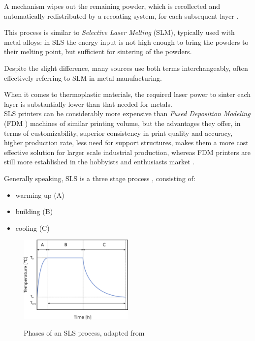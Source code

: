 \documentclass[a4paper]{article}
\begin{document}
    A mechanism wipes out the remaining powder, which is recollected and automatically redistributed by a recoating 
    system, for each subsequent layer \autocite*{Padovano_SLS_Review}. 

    This process is similar to \textit{Selective Laser Melting} (SLM), typically used with metal alloys: in SLS the energy input is not high enough 
    to bring the powders to their melting point, but sufficient for sintering of the powders. 

    Despite the slight difference, many sources use both terms interchangeably, often effectively referring to SLM in metal manufacturing. 
    
    When it comes to thermoplastic materials, the required laser power to sinter each layer is substantially lower than that needed for metals. \\ 

    SLS printers can be considerably more expensive than \textit{Fused Deposition Modeling} (FDM \footnotemark) machines of similar printing volume, but the advantages they offer, 
    in terms of customizability, superior consistency in print quality and accuracy, higher production rate, less need for support structures, 
    makes them a more cost effective solution for larger scale industrial production, whereas FDM printers are still more established 
    in the hobbyists and enthusiasts market \autocite*{Padovano_SLS_Review}. \\ 


    Generally speaking, SLS is a three stage process \autocites{Padovano_SLS_Review}, consisting of: 
    
    \begin{itemize}
        \item warming up (A)
        \item building (B)
        \item cooling (C)
    \end{itemize}

    \begin{figure}[H]
        \centering
        \includegraphics[width=0.5\textwidth]{Pictures/SLS_temp_over_time.eps}\\
        \caption{Phases of an SLS process, adapted from \autocites{Padovano_SLS_Review}} 
        \label{fig:SLS_temp_over_time}
    \end{figure}
\end{document}
